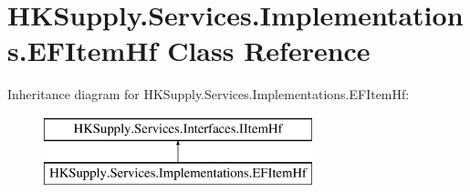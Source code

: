 \hypertarget{class_h_k_supply_1_1_services_1_1_implementations_1_1_e_f_item_hf}{}\section{H\+K\+Supply.\+Services.\+Implementations.\+E\+F\+Item\+Hf Class Reference}
\label{class_h_k_supply_1_1_services_1_1_implementations_1_1_e_f_item_hf}
Inheritance diagram for H\+K\+Supply.\+Services.\+Implementations.\+E\+F\+Item\+Hf\+:\begin{figure}[H]
\begin{center}
\leavevmode
\includegraphics[height=2.000000cm]{class_h_k_supply_1_1_services_1_1_implementations_1_1_e_f_item_hf}
\end{center}
\end{figure}
